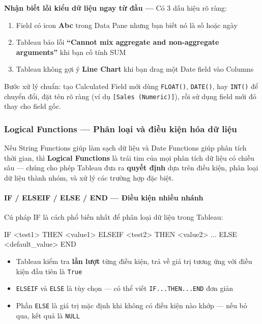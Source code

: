 \documentclass[12pt]{article}
\begin{document}
\begin{notebox}
\textbf{Nhận biết lỗi kiểu dữ liệu ngay từ đầu ---} Có 3 dấu hiệu rõ ràng:
\begin{enumerate}[nosep]
    \item Field có icon \textbf{Abc} trong Data Pane nhưng bạn biết nó là số hoặc ngày
    \item Tableau báo lỗi \textbf{``Cannot mix aggregate and non-aggregate arguments''} khi bạn cố tính SUM
    \item Tableau không gợi ý \textbf{Line Chart} khi bạn drag một Date field vào Columns
\end{enumerate}
\noindent Bước xử lý chuẩn: tạo Calculated Field mới dùng \texttt{FLOAT()}, \texttt{DATE()}, hay \texttt{INT()} để chuyển đổi, đặt tên rõ ràng (ví dụ \texttt{[Sales (Numeric)]}), rồi sử dụng field mới đó thay cho field gốc.
\end{notebox}

\subsubsection{Logical Functions --- Phân loại và điều kiện hóa dữ liệu}

\noindent Nếu String Functions giúp làm sạch dữ liệu và Date Functions giúp phân tích thời gian, thì \textbf{Logical Functions} là trái tim của mọi phân tích dữ liệu có chiều sâu --- chúng cho phép Tableau đưa ra \textbf{quyết định} dựa trên điều kiện, phân loại dữ liệu thành nhóm, và xử lý các trường hợp đặc biệt.

\paragraph{IF / ELSEIF / ELSE / END --- Điều kiện nhiều nhánh}

\noindent Cú pháp IF là cách phổ biến nhất để phân loại dữ liệu trong Tableau:

\begin{aivncodebox}[]
\begin{python}
IF <test1> THEN <value1>
ELSEIF <test2> THEN <value2>
...
ELSE <default_value>
END
\end{python}
\end{aivncodebox}

\begin{itemize}[nosep]
    \item Tableau kiểm tra \textbf{lần lượt} từng điều kiện, trả về giá trị tương ứng với điều kiện đầu tiên là \texttt{True}
    \item \texttt{ELSEIF} và \texttt{ELSE} là tùy chọn --- có thể viết \texttt{IF...THEN...END} đơn giản
    \item Phần \texttt{ELSE} là giá trị mặc định khi không có điều kiện nào khớp --- nếu bỏ qua, kết quả là \texttt{NULL}
\end{itemize}
\end{document}
